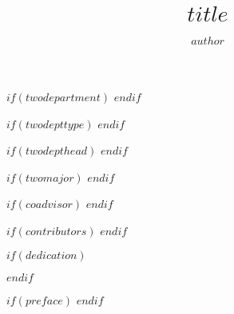 \title{$title$} %
\author{$author$} %

$if(twodepartment)$
$endif$

$if(twodepttype)$
$endif$

$if(twodepthead)$
$endif$

$if(twomajor)$
$endif$

$if(coadvisor)$
$endif$




$if(contributors)$
$endif$


$if(dedication)$
	\dedication{$dedication$}
$endif$

$if(preface)$
$endif$